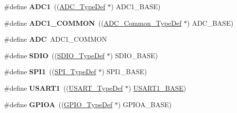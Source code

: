 \begin{DoxyCompactItemize}
\item 
\hypertarget{group___peripheral__declaration_ga90d2d5c526ce5c0a551f533eccbee71a}{\#define {\bfseries A\-D\-C1}~((\hyperlink{struct_a_d_c___type_def}{A\-D\-C\-\_\-\-Type\-Def} $\ast$) A\-D\-C1\-\_\-\-B\-A\-S\-E)}\label{group___peripheral__declaration_ga90d2d5c526ce5c0a551f533eccbee71a}

\item 
\hypertarget{group___peripheral__declaration_gaf1919c64fc774aab31190346fd5457e2}{\#define {\bfseries A\-D\-C1\-\_\-\-C\-O\-M\-M\-O\-N}~((\hyperlink{struct_a_d_c___common___type_def}{A\-D\-C\-\_\-\-Common\-\_\-\-Type\-Def} $\ast$) A\-D\-C\-\_\-\-B\-A\-S\-E)}\label{group___peripheral__declaration_gaf1919c64fc774aab31190346fd5457e2}

\item 
\hypertarget{group___peripheral__declaration_ga54d148b91f3d356713f7e367a2243bea}{\#define {\bfseries A\-D\-C}~A\-D\-C1\-\_\-\-C\-O\-M\-M\-O\-N}\label{group___peripheral__declaration_ga54d148b91f3d356713f7e367a2243bea}

\item 
\hypertarget{group___peripheral__declaration_ga8149aa2760fffac16bc75216d5fd9331}{\#define {\bfseries S\-D\-I\-O}~((\hyperlink{struct_s_d_i_o___type_def}{S\-D\-I\-O\-\_\-\-Type\-Def} $\ast$) S\-D\-I\-O\-\_\-\-B\-A\-S\-E)}\label{group___peripheral__declaration_ga8149aa2760fffac16bc75216d5fd9331}

\item 
\hypertarget{group___peripheral__declaration_gad483be344a28ac800be8f03654a9612f}{\#define {\bfseries S\-P\-I1}~((\hyperlink{struct_s_p_i___type_def}{S\-P\-I\-\_\-\-Type\-Def} $\ast$) S\-P\-I1\-\_\-\-B\-A\-S\-E)}\label{group___peripheral__declaration_gad483be344a28ac800be8f03654a9612f}

\item 
\hypertarget{group___peripheral__declaration_ga92871691058ff7ccffd7635930cb08da}{\#define {\bfseries U\-S\-A\-R\-T1}~((\hyperlink{struct_u_s_a_r_t___type_def}{U\-S\-A\-R\-T\-\_\-\-Type\-Def} $\ast$) \hyperlink{group___peripheral__memory__map_ga86162ab3f740db9026c1320d46938b4d}{U\-S\-A\-R\-T1\-\_\-\-B\-A\-S\-E})}\label{group___peripheral__declaration_ga92871691058ff7ccffd7635930cb08da}

\item 
\hypertarget{group___peripheral__declaration_gac485358099728ddae050db37924dd6b7}{\#define {\bfseries G\-P\-I\-O\-A}~((\hyperlink{struct_g_p_i_o___type_def}{G\-P\-I\-O\-\_\-\-Type\-Def} $\ast$) G\-P\-I\-O\-A\-\_\-\-B\-A\-S\-E)}\label{group___peripheral__declaration_gac485358099728ddae050db37924dd6b7}


\end{DoxyCompactItemize}
